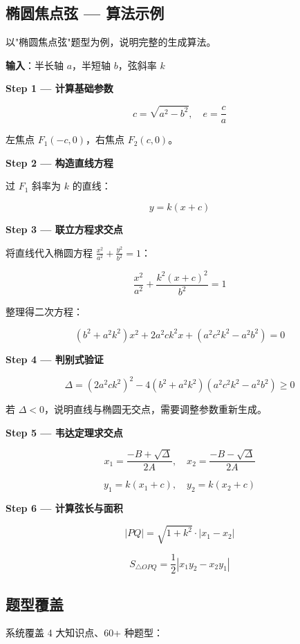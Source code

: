 \documentclass[11pt,a4paper]{article}
\begin{document}
\subsection{椭圆焦点弦 — 算法示例}

以"椭圆焦点弦"题型为例，说明完整的生成算法。

\textbf{输入}：半长轴 $a$，半短轴 $b$，弦斜率 $k$

\textbf{Step 1 — 计算基础参数}

\[
c = \sqrt{a^2 - b^2}, \quad e = \frac{c}{a}
\]

左焦点 $F_1(-c, 0)$，右焦点 $F_2(c, 0)$。

\textbf{Step 2 — 构造直线方程}

过 $F_1$ 斜率为 $k$ 的直线：

\[
y = k(x + c)
\]

\textbf{Step 3 — 联立方程求交点}

将直线代入椭圆方程 $\frac{x^2}{a^2} + \frac{y^2}{b^2} = 1$：

\[
\frac{x^2}{a^2} + \frac{k^2(x+c)^2}{b^2} = 1
\]

整理得二次方程：

\[
(b^2 + a^2k^2)x^2 + 2a^2ck^2x + (a^2c^2k^2 - a^2b^2) = 0
\]

\textbf{Step 4 — 判别式验证}

\[
\Delta = (2a^2ck^2)^2 - 4(b^2 + a^2k^2)(a^2c^2k^2 - a^2b^2) \geq 0
\]

\begin{warningbox}
若 $\Delta < 0$，说明直线与椭圆无交点，需要调整参数重新生成。
\end{warningbox}

\textbf{Step 5 — 韦达定理求交点}

\[
x_1 = \frac{-B + \sqrt{\Delta}}{2A}, \quad x_2 = \frac{-B - \sqrt{\Delta}}{2A}
\]

\[
y_1 = k(x_1 + c), \quad y_2 = k(x_2 + c)
\]

\textbf{Step 6 — 计算弦长与面积}

\[
|PQ| = \sqrt{1 + k^2} \cdot |x_1 - x_2|
\]

\[
S_{\triangle OPQ} = \frac{1}{2}|x_1 y_2 - x_2 y_1|
\]

\subsection{题型覆盖}

系统覆盖 4 大知识点、60+ 种题型：
\end{document}
